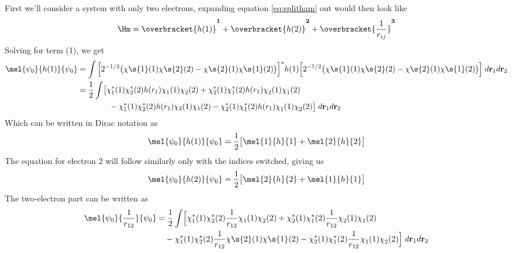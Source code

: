 \documentclass[11pt]{article}
\begin{document}
First we'll consider a system with only two electrons, expanding equation \eqref{eq:splitham} out would then look like
\begin{equation}
\Hm = \overbracket{h(1)\vphantom{\frac{1}{r_{ij}}}}^{\mathbf{1} } + \overbracket{h(2)\vphantom{\frac{1}{r_{ij}}}}^{\mathbf{2}} + \overbracket{\frac{1}{r_{ij}}}^{\mathbf{3}}
\end{equation}
Solving for term (1), we get
\begin{align*}
\mel{\psi_0}{h(1)}{\psi_0} &= \int \Big[ 2^{-1/2} \big(\chi\s{1}(1)\chi\s{2}(2) - \chi\s{2}(1) \chi\s{1} (2)\big) \Big]^* h(1) \Big[2^{-1/2} \big(\chi\s{1}(1)\chi\s{2}(2) - \chi\s{2}(1) \chi\s{1} (2)\big) \Big]\; d\mathbf{r}_1 d\mathbf{r}_2\\ 
&= \frac{1}{2} \int \bigl[\chi_1^{*} (1) \chi_2^{*}(2) h(r_1) \chi_1^{}(1) \chi_2^{}(2) + \chi_2^{*}(1)\chi_1^{*}(2)h(r_1)\chi_2^{} (1) \chi_1^{}(2) \\
&\qquad\qquad - \chi_1^{*} (1) \chi_2^{*}(2)h(r_1)\chi_{2} (1) \chi_{1} (2) -\chi_2^{*} (1) \chi_1^{*}(2) h(r_1) \chi_1^{} (1) \chi_2^{}(2) \bigr]\; d\mathbf{r}_1 d\mathbf{r}_2
\end{align*}
Which can be written in Dirac notation as
\begin{equation}
\mel{\psi_0}{h(1)}{\psi_0}= \frac{1}{2}\bigl[\mel{1}{h}{1}+\mel{2}{h}{2}\bigr]
\end{equation}
The equation for electron 2 will follow similarly only with the indices switched, giving us 
\begin{equation}
\mel{\psi_0}{h(2)}{\psi_0}= \frac{1}{2}\bigl[\mel{2}{h}{2}+\mel{1}{h}{1}\bigr]
\end{equation}
The two-electron part can be written as 
\begin{align}\nonumber
\mel{\psi_0}{\frac{1}{r_{12}}}{\psi_0} &= \frac{1}{2} \int \Bigl[\chi_1^{*} (1) \chi_2^{*}(2) \frac{1}{r_{12}} \chi_1^{}(1) \chi_2^{}(2) +\chi_2^{*}(1)\chi_1^{*}(2)\frac{1}{r_{12}}\chi_2^{} (1) \chi_1^{}(2) \\
&\quad - \chi_1^{*} (1) \chi_2^{*}(2)\frac{1}{r_{12}}\chi\s{2} (1) \chi\s{1} (2) -\chi_2^{*} (1) \chi_1^{*}(2) \frac{1}{r_{12}} \chi_1^{} (1) \chi_2^{}(2) \Bigr]\; d\mathbf{r}_1 d\mathbf{r}_2
\end{align}
\end{document}
